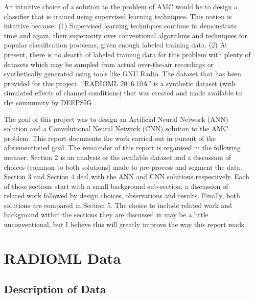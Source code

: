 \documentclass[journal,onecolumn]{IEEEtran}
\begin{document}
An intuitive choice of a solution to the problem of AMC would be to design a classifier that is trained using supervised learning techniques. This notion is intuitive because:
(1)	Supervised learning techniques continue to demonstrate time and again, their superiority over conventional algorithms and techniques for popular classification problems, given enough labeled training data. 
(2)	At present, there is no dearth of labeled training data for this problem with plenty of datasets which may be sampled from actual over-the-air recordings or synthetically generated using tools like GNU Radio. The dataset that has been provided for this project, “RADIOML 2016.10A” is a synthetic dataset (with simulated effects of channel conditions) that was created and made available to the community by DEEPSIG \cite{rmlDset}.

The goal of this project was to design an Artificial Neural Network (ANN) solution and a Convolutional Neural Network (CNN) solution to the AMC problem. This report documents the work carried out in pursuit of the aforementioned goal.  The remainder of this report is organised in the following manner. Section 2 is an analysis of the available dataset and a discussion of choices (common to both solutions) made to pre-process and segment the data. Section 3 and Section 4 deal with the ANN and CNN solutions respectively. Each of these sections start with a small background sub-section, a discussion of related work followed by design choices, observations and results. Finally, both solutions are compared in Section 5. The choice to include related work and background within the sections they are discussed in may be a little unconventional, but I believe this will greatly improve the way this report reads.


 

\section{RADIOML Data}

\subsection{Description of Data}
\end{document}
